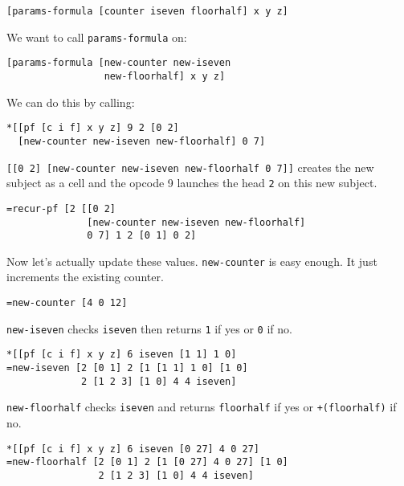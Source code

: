 \documentclass[twoside]{article}
\begin{document}
\begin{lstlisting}[style=listingblock]
[params-formula [counter iseven floorhalf] x y z]
\end{lstlisting}

We want to call \lstinline[style=inlinecode]{params-formula} on:

\begin{lstlisting}[style=listingblock]
[params-formula [new-counter new-iseven
                 new-floorhalf] x y z]
\end{lstlisting}

We can do this by calling:

\begin{lstlisting}[style=listingblock]
*[[pf [c i f] x y z] 9 2 [0 2]
  [new-counter new-iseven new-floorhalf] 0 7]
\end{lstlisting}

\lstinline[style=inlinecode]{[[0 2] [new-counter new-iseven new-floorhalf 0 7]]} creates the new subject as a cell and the opcode 9 launches the head \lstinline[style=inlinecode]{2} on this new subject.

\begin{lstlisting}[style=listingblock]
=recur-pf [2 [[0 2]
              [new-counter new-iseven new-floorhalf]
              0 7] 1 2 [0 1] 0 2]
\end{lstlisting}

Now let's actually update these values. \lstinline[style=inlinecode]{new-counter} is easy enough. It just increments the existing counter.

\begin{lstlisting}[style=listingblock]
=new-counter [4 0 12]
\end{lstlisting}

\lstinline[style=inlinecode]{new-iseven} checks \lstinline[style=inlinecode]{iseven} then returns \lstinline[style=inlinecode]{1} if yes or \lstinline[style=inlinecode]{0} if no.

\begin{lstlisting}[style=listingblock]
*[[pf [c i f] x y z] 6 iseven [1 1] 1 0]
=new-iseven [2 [0 1] 2 [1 [1 1] 1 0] [1 0]
             2 [1 2 3] [1 0] 4 4 iseven]
\end{lstlisting}

\lstinline[style=inlinecode]{new-floorhalf} checks \lstinline[style=inlinecode]{iseven} and returns \lstinline[style=inlinecode]{floorhalf} if yes or \lstinline[style=inlinecode]{+(floorhalf)} if no.

\begin{lstlisting}[style=listingblock]
*[[pf [c i f] x y z] 6 iseven [0 27] 4 0 27]
=new-floorhalf [2 [0 1] 2 [1 [0 27] 4 0 27] [1 0]
                2 [1 2 3] [1 0] 4 4 iseven]
\end{lstlisting}
\end{document}
